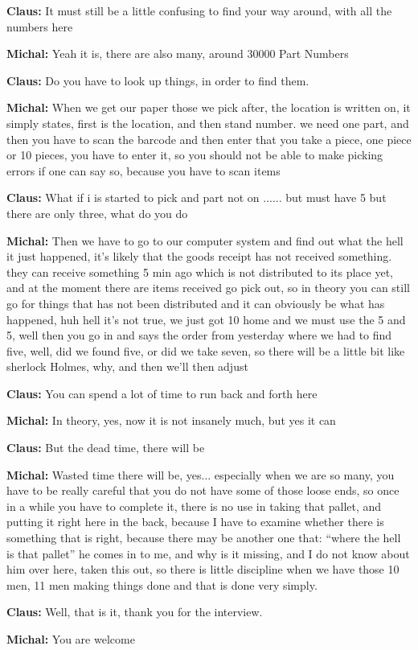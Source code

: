 \textbf{Claus:} It must still be a little confusing to find your way around,
with all the numbers here\nl

\textbf{Michal:} Yeah it is,  there are also many, around 30000 Part
Numbers\nl

\textbf{Claus:} Do you have to look up things,  in order to find them.\nl

\textbf{Michal:} When we get our paper those we pick after, the location is
written on, it simply states, first is the location, and then stand number.  we
need one part, and then you have to scan the barcode and then enter that you
take a piece, one piece or 10 pieces, you have to enter it, so you should not be
able to make picking errors if one can say so, because you have to scan items\nl

\textbf{Claus:} What if i is started to pick and part not on ...... but must
have 5 but there are only three, what do you do\nl

\textbf{Michal:} Then we have to go to our computer system and find out what the
hell it just happened, it's likely that the goods receipt has not received
something. they can receive something 5 min ago which is not distributed to its
place yet, and at the moment there are items received go pick out, so in theory
you can still go for things that has not been distributed and it can obviously
be what has happened, huh hell it's not true, we just got 10 home and we must
use the 5 and 5, well then you go in and says the order from yesterday where we
had to find five, well, did we found five, or did we take seven, so there will
be a little bit like sherlock Holmes, why, and then we'll then adjust\nl

\textbf{Claus:} You can spend a lot of time to run back and forth here\nl

\textbf{Michal:} In theory, yes, now it is not insanely much, but yes it can
\nl

\textbf{Claus:} But the dead time, there will be \nl

\textbf{Michal:} Wasted time there will be, yes... especially when
we are so many, you have to be really careful that you do not have some of
those loose ends, so once in a while you have to complete it, there is no use
in taking that pallet, and putting it right here in the back, because I have to
examine whether there is something that is right, because there may be
another one that: “where the hell is that pallet” he comes in to me, and why is
it missing, and I do not know about him over here, taken this out, so there is little discipline
when we have those 10 men, 11 men making things done and that is done
very simply. \nl

\textbf{Claus:} Well, that is it, thank you for the interview.\nl

\textbf{Michal:} You are welcome \newpage




